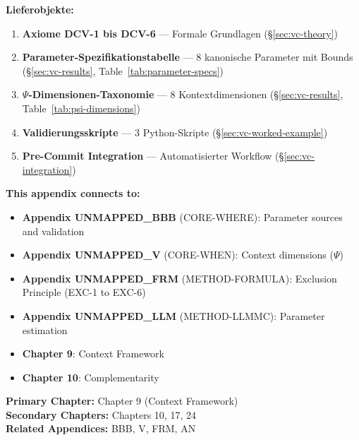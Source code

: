 \begin{tcolorbox}[colback=purple!5!white, colframe=purple!75!black, title=Appendix Scope:]
\vspace{0.3em}
\textbf{Lieferobjekte:}
\begin{enumerate}[label=\textbf{L\arabic*}:, leftmargin=2cm]
    \item \textbf{Axiome DCV-1 bis DCV-6} --- Formale Grundlagen (\S\ref{sec:vc-theory})
    \item \textbf{Parameter-Spezifikationstabelle} --- 8 kanonische Parameter mit Bounds (\S\ref{sec:vc-results}, Table~\ref{tab:parameter-specs})
    \item \textbf{$\Psi$-Dimensionen-Taxonomie} --- 8 Kontextdimensionen (\S\ref{sec:vc-results}, Table~\ref{tab:psi-dimensions})
    \item \textbf{Validierungsskripte} --- 3 Python-Skripte (\S\ref{sec:vc-worked-example})
    \item \textbf{Pre-Commit Integration} --- Automatisierter Workflow (\S\ref{sec:vc-integration})
\end{enumerate}

\end{tcolorbox}

\begin{tcolorbox}[colback=blue!5!white, colframe=blue!75!black, title=Cross-Reference Map]
\textbf{This appendix connects to:}
\begin{itemize}
    \item \textbf{Appendix UNMAPPED_BBB} (CORE-WHERE): Parameter sources and validation
    \item \textbf{Appendix UNMAPPED_V} (CORE-WHEN): Context dimensions ($\Psi$)
    \item \textbf{Appendix UNMAPPED_FRM} (METHOD-FORMULA): Exclusion Principle (EXC-1 to EXC-6)
    \item \textbf{Appendix UNMAPPED_LLM} (METHOD-LLMMC): Parameter estimation
    \item \textbf{Chapter 9}: Context Framework
    \item \textbf{Chapter 10}: Complementarity
\end{itemize}
\end{tcolorbox}

\begin{tcolorbox}[colback=green!5!white, colframe=green!75!black, title=Chapter Linkage]
\textbf{Primary Chapter:} Chapter 9 (Context Framework) \\
\textbf{Secondary Chapters:} Chapters 10, 17, 24 \\
\textbf{Related Appendices:} BBB, V, FRM, AN
\end{tcolorbox}

